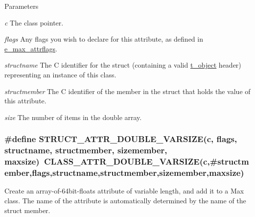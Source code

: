 \begin{DoxyParams}{Parameters}
\item[{\em c}]The class pointer. \item[{\em flags}]Any flags you wish to declare for this attribute, as defined in \hyperlink{group__attr_gaf296cfc6741bb19207f6ed8062809115}{e\_\-max\_\-attrflags}. \item[{\em structname}]The C identifier for the struct (containing a valid \hyperlink{structt__object}{t\_\-object} header) representing an instance of this class. \item[{\em structmember}]The C identifier of the member in the struct that holds the value of this attribute. \item[{\em size}]The number of items in the double array. \end{DoxyParams}
\hypertarget{group__attr_ga4c090b96f117ce8843af9d9ffba29f8d}{
\subsubsection[{STRUCT\_\-ATTR\_\-DOUBLE\_\-VARSIZE}]{\setlength{\rightskip}{0pt plus 5cm}\#define STRUCT\_\-ATTR\_\-DOUBLE\_\-VARSIZE(c, \/  flags, \/  structname, \/  structmember, \/  sizemember, \/  maxsize)~CLASS\_\-ATTR\_\-DOUBLE\_\-VARSIZE(c,\#structmember,flags,structname,structmember,sizemember,maxsize)}}
\label{group__attr_ga4c090b96f117ce8843af9d9ffba29f8d}


Create an array-\/of-\/64bit-\/floats attribute of variable length, and add it to a Max class. The name of the attribute is automatically determined by the name of the struct member.


